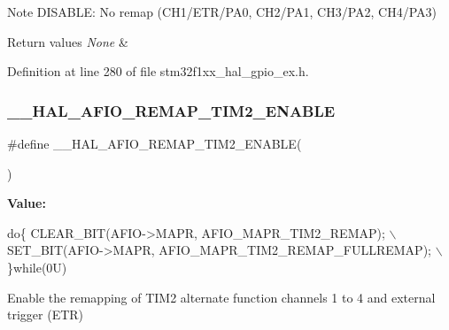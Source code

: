 \begin{DoxyNote}{Note}
D\+I\+S\+A\+B\+LE\+: No remap (C\+H1/\+E\+T\+R/\+P\+A0, C\+H2/\+P\+A1, C\+H3/\+P\+A2, C\+H4/\+P\+A3) 
\end{DoxyNote}

\begin{DoxyRetVals}{Return values}
{\em None} & \\
\hline
\end{DoxyRetVals}


Definition at line 280 of file stm32f1xx\+\_\+hal\+\_\+gpio\+\_\+ex.\+h.

\mbox{\label{group___g_p_i_o_ex___a_f_i_o___a_f___r_e_m_a_p_p_i_n_g_gad5ea791926cf2e879de0fd08cb129775}} 
\subsubsection{\texorpdfstring{\+\_\+\+\_\+\+H\+A\+L\+\_\+\+A\+F\+I\+O\+\_\+\+R\+E\+M\+A\+P\+\_\+\+T\+I\+M2\+\_\+\+E\+N\+A\+B\+LE}{\_\_HAL\_AFIO\_REMAP\_TIM2\_ENABLE}}
{\footnotesize\ttfamily \#define \+\_\+\+\_\+\+H\+A\+L\+\_\+\+A\+F\+I\+O\+\_\+\+R\+E\+M\+A\+P\+\_\+\+T\+I\+M2\+\_\+\+E\+N\+A\+B\+LE(\begin{DoxyParamCaption}{ }\end{DoxyParamCaption})}

{\bfseries Value\+:}
\begin{DoxyCode}
\textcolor{keywordflow}{do}\{ CLEAR\_BIT(AFIO->MAPR, AFIO\_MAPR\_TIM2\_REMAP);         \(\backslash\)
                                            SET\_BIT(AFIO->MAPR, AFIO\_MAPR\_TIM2\_REMAP\_FULLREMAP); \(\backslash\)
                                          \}\textcolor{keywordflow}{while}(0U)
\end{DoxyCode}


Enable the remapping of T\+I\+M2 alternate function channels 1 to 4 and external trigger (E\+TR) 

